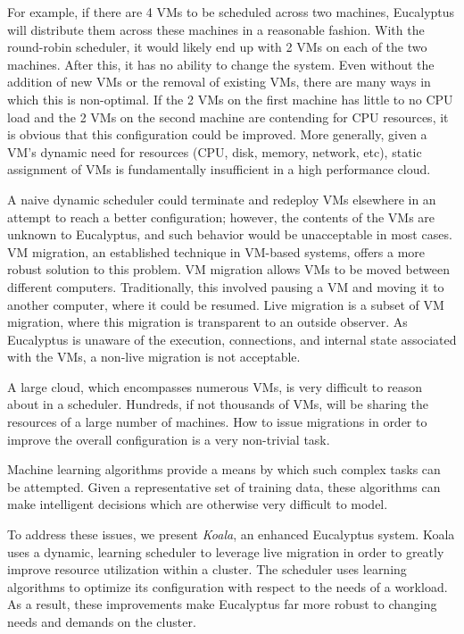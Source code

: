 For example, if there are 4 VMs to be scheduled across two machines, Eucalyptus will distribute them across these machines in a reasonable fashion.  With the round-robin scheduler, it would likely end up with 2 VMs on each of the two machines.  After this, it has no ability to change the system.  Even without the addition of new VMs or the removal of existing VMs, there are many ways in which this is non-optimal.  If the 2 VMs on the first machine has little to no CPU load and the 2 VMs on the second machine are contending for CPU resources, it is obvious that this configuration could be improved.  More generally, given a VM's dynamic need for resources (CPU, disk, memory, network, etc), static assignment of VMs is fundamentally insufficient in a high performance cloud.

A naive dynamic scheduler could terminate and redeploy VMs elsewhere in an attempt to reach a better configuration;  however, the contents of the VMs are unknown to Eucalyptus, and such behavior would be unacceptable in most cases.  VM migration, an established technique in VM-based systems, offers a more robust solution to this problem.  VM migration allows VMs to be moved between different computers.  Traditionally, this involved pausing a VM and moving it to another computer, where it could be resumed.  Live migration is a subset of VM migration, where this migration is transparent to an outside observer.  As Eucalyptus is unaware of the execution, connections, and internal state associated with the VMs, a non-live migration is not acceptable.  

A large cloud, which encompasses numerous VMs, is very difficult to reason about in a scheduler.  Hundreds, if not thousands of VMs, will be sharing the resources of a large number of machines.  How to issue migrations in order to improve the overall configuration is a very non-trivial task.  

Machine learning algorithms provide a means by which such complex tasks can be attempted.  Given a representative set of training data, these algorithms can make intelligent decisions which are otherwise very difficult to model.

To address these issues, we present \emph{Koala}, an enhanced Eucalyptus system.  Koala uses a dynamic, learning scheduler to leverage live migration in order to greatly improve resource utilization within a cluster.  The scheduler uses learning algorithms to optimize its configuration with respect to the needs of a workload.  As a result, these improvements make Eucalyptus far more robust to changing needs and demands on the cluster.


